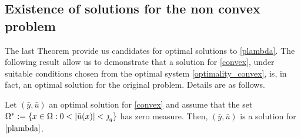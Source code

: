 \subsection{Existence of solutions for the non convex problem}

The last Theorem provide us candidates for optimal solutions to \eqref{plambda}. The following result 
allow us to demonstrate that a solution for \eqref{convex}, under suitable conditions chosen from the 
optimal system \eqref{optimality_convex}, is, in fact, an optimal solution for the original problem. 
Details are as follows.

\begin{theorem}
    Let $(\bar{y},\bar{u})$ an optimal solution for \eqref{convex} and assume that the set 
	$\om^*:=\{x\in \om: 0<|\bar{u}(x)|<\jump_q\}$ has zero measure. Then, $(\bar{y},\bar{u})$ is a 
	solution for $\eqref{plambda}$.
\end{theorem}
